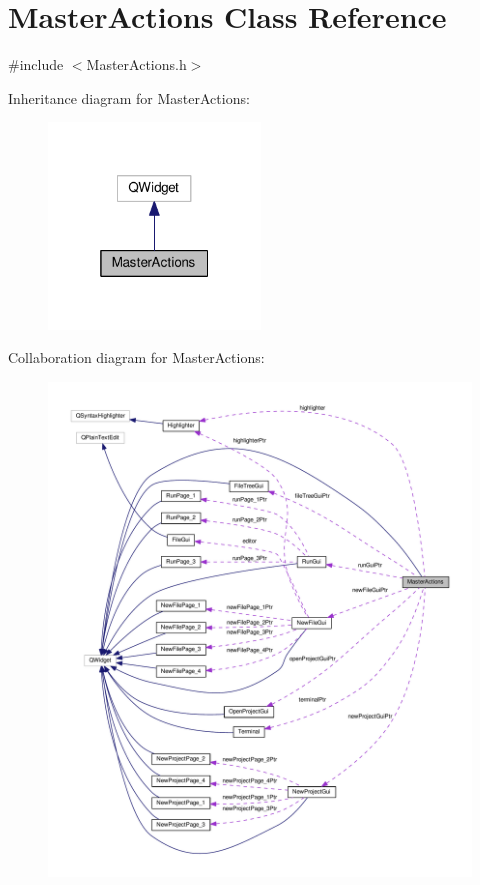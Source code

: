 \hypertarget{class_master_actions}{\section{Master\-Actions Class Reference}
\label{class_master_actions}
}


{\ttfamily \#include $<$Master\-Actions.\-h$>$}



Inheritance diagram for Master\-Actions\-:\nopagebreak
\begin{figure}[H]
\begin{center}
\leavevmode
\includegraphics[width=160pt]{class_master_actions__inherit__graph}
\end{center}
\end{figure}


Collaboration diagram for Master\-Actions\-:\nopagebreak
\begin{figure}[H]
\begin{center}
\leavevmode
\includegraphics[width=350pt]{class_master_actions__coll__graph}
\end{center}
\end{figure}
